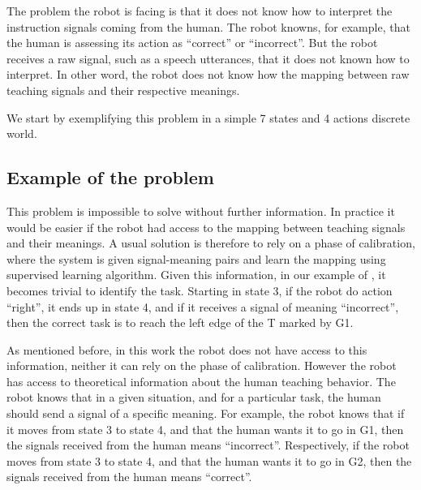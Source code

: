 The problem the robot is facing is that it does not know how to interpret the instruction signals coming from the human. The robot knowns, for example, that the human is assessing its action as ``correct'' or ``incorrect''. But the robot receives a raw signal, such as a speech utterances, that it does not known how to interpret. In other word, the robot does not know how the mapping between raw teaching signals and their respective meanings.

We start by exemplifying this problem in a simple 7 states and 4 actions discrete world.

\subsection{Example of the problem}
\label{chapter:lfui:example}





\transition

This problem is impossible to solve without further information. In practice it would be easier if the robot had access to the mapping between teaching signals and their meanings. A usual solution is therefore to rely on a phase of calibration, where the system is given signal-meaning pairs and learn the mapping using supervised learning algorithm. Given this information, in our example of , it becomes trivial to identify the task. Starting in state 3, if the robot do action ``right'', it ends up in state 4, and if it receives a signal of meaning ``incorrect'', then the correct task is to reach the left edge of the T marked by G1.

As mentioned before, in this work the robot does not have access to this information, neither it can rely on the phase of calibration. However the robot has access to theoretical information about the human teaching behavior. The robot knows that in a given situation, and for a particular task, the human should send a signal of a specific meaning. For example, the robot knows that if it moves from state 3 to state 4, and that the human wants it to go in G1, then the signals received from the human means ``incorrect''. Respectively, if the robot moves from state 3 to state 4, and that the human wants it to go in G2, then the signals received from the human means ``correct''.

